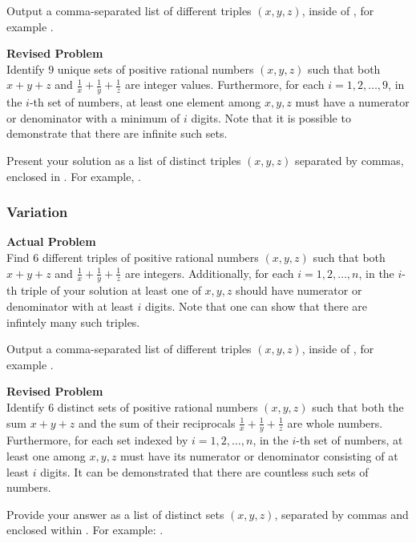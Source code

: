 Output a comma-separated list of different triples $(x, y, z)$, inside of \boxed, for example .

\textbf{Revised Problem}\\
Identify $9$ unique sets of positive rational numbers $(x, y, z)$ such that both $x + y + z$ and $\frac{1}{x} + \frac{1}{y} + \frac{1}{z}$ are integer values. Furthermore, for each $i = 1, 2, \ldots, 9$, in the $i$-th set of numbers, at least one element among $x, y, z$ must have a numerator or denominator with a minimum of $i$ digits. Note that it is possible to demonstrate that there are infinite such sets.

Present your solution as a list of distinct triples $(x, y, z)$ separated by commas, enclosed in \boxed. For example, .

\subsubsection{Variation}
\textbf{Actual Problem}\\
Find $6$ different triples of positive rational numbers $(x, y, z)$ such that both $x + y + z$ and $\frac{1}{x} + \frac{1}{y} + \frac{1}{z}$ are integers.
Additionally, for each $i = 1, 2, \ldots, n$, in the $i$-th triple of your solution at least one of $x, y, z$ should have numerator or denominator with at least $i$ digits.
Note that one can show that there are infintely many such triples.


Output a comma-separated list of different triples $(x, y, z)$, inside of \boxed, for example .

\textbf{Revised Problem}\\
Identify $6$ distinct sets of positive rational numbers $(x, y, z)$ such that both the sum $x + y + z$ and the sum of their reciprocals $\frac{1}{x} + \frac{1}{y} + \frac{1}{z}$ are whole numbers. Furthermore, for each set indexed by $i = 1, 2, \ldots, n$, in the $i$-th set of numbers, at least one among $x, y, z$ must have its numerator or denominator consisting of at least $i$ digits. It can be demonstrated that there are countless such sets of numbers.

Provide your answer as a list of distinct sets $(x, y, z)$, separated by commas and enclosed within \boxed. For example: .

